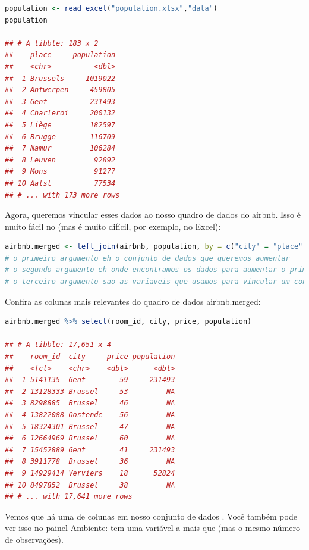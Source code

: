 \documentclass{article}
\begin{document}
\begin{lstlisting}[language=R]
population <- read_excel("population.xlsx","data")
population

## # A tibble: 183 x 2
##    place     population
##    <chr>          <dbl>
##  1 Brussels     1019022
##  2 Antwerpen     459805
##  3 Gent          231493
##  4 Charleroi     200132
##  5 Liège         182597
##  6 Brugge        116709
##  7 Namur         106284
##  8 Leuven         92892
##  9 Mons           91277
## 10 Aalst          77534
## # ... with 173 more rows
\end{lstlisting}


Agora, queremos vincular esses dados ao nosso quadro de dados do airbnb. Isso é muito fácil no \faRProject (mas é muito difícil, por exemplo, no Excel):

\begin{lstlisting}[language=R]
airbnb.merged <- left_join(airbnb, population, by = c("city" = "place"))
# o primeiro argumento eh o conjunto de dados que queremos aumentar
# o segundo argumento eh onde encontramos os dados para aumentar o primeiro conjunto de dados com
# o terceiro argumento sao as variaveis que usamos para vincular um conjunto de dados ao outro (cidade eh uma variavel no airbnb, local eh uma variavel na populacao)   
\end{lstlisting}

Confira as colunas mais relevantes do quadro de dados airbnb.merged:

\begin{lstlisting}[language=R]
airbnb.merged %>% select(room_id, city, price, population)

## # A tibble: 17,651 x 4
##    room_id  city     price population
##    <fct>    <chr>    <dbl>      <dbl>
##  1 5141135  Gent        59     231493
##  2 13128333 Brussel     53         NA
##  3 8298885  Brussel     46         NA
##  4 13822088 Oostende    56         NA
##  5 18324301 Brussel     47         NA
##  6 12664969 Brussel     60         NA
##  7 15452889 Gent        41     231493
##  8 3911778  Brussel     36         NA
##  9 14929414 Verviers    18      52824
## 10 8497852  Brussel     38         NA
## # ... with 17,641 more rows
\end{lstlisting}

Vemos que há uma  de colunas em nosso conjunto de dados . Você também pode ver isso no painel Ambiente:  tem uma variável a mais que  (mas o mesmo número de observações).
\end{document}

